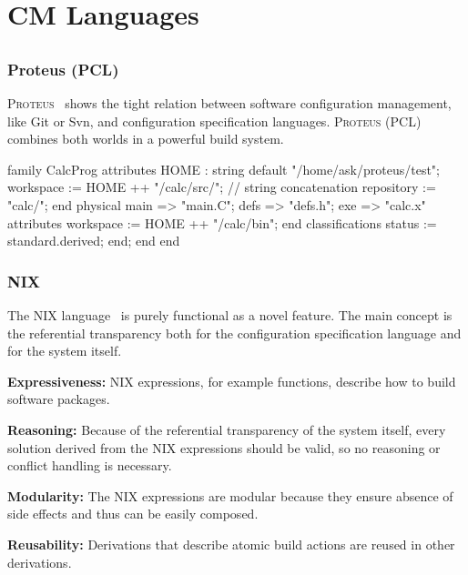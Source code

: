 \section{CM Languages}

\subsection{}

\begin{frame}[fragile]
	\frametitle{Proteus (PCL)}
	\textsc{Proteus}~\cite{tryggeseth1995modelling} shows the tight relation between software configuration management, like Git or Svn, and configuration specification languages.
	\textsc{Proteus} (PCL) combines both worlds in a powerful build system.

	\begin{code}[basicstyle=\tiny,morekeywords={family,attributes,end,physical,default,classifications},gobble=4,language=]
	family CalcProg
		attributes
			HOME : string default "/home/ask/proteus/test";
			workspace := HOME ++ "/calc/src/"; // string concatenation
			repository := "calc/";
			end
		physical
			main => "main.C";
			defs => "defs.h";
			exe => "calc.x" attributes workspace := HOME ++ "/calc/bin"; end
			classifications status := standard.derived; end;
		end
	end
	\end{code}
\end{frame}

\begin{frame}
	\frametitle{NIX}

	The NIX language~\cite{dolstra2007purely} is purely functional as a novel feature.
	The main concept is the referential transparency both for the configuration specification language and for the system itself.

	\textbf{Expressiveness:}
	NIX expressions, for example functions, describe how to build software packages.

	\textbf{Reasoning:}
	Because of the referential transparency of the system itself, every solution derived from the NIX expressions should be valid, so no reasoning or conflict handling is necessary.

	\textbf{Modularity:}
	The NIX expressions are modular because they ensure absence of side effects and thus can be easily composed.

	\textbf{Reusability:}
	Derivations that describe atomic build actions are reused in other derivations.
\end{frame}

